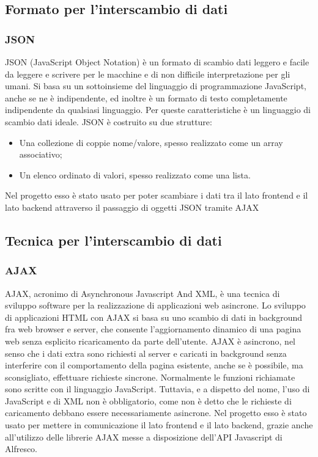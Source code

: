 \subsection{Formato per l’interscambio di dati}
\subsubsection{JSON}
JSON (JavaScript Object Notation) è un formato di scambio dati leggero e facile
da leggere e scrivere per le macchine e di non difficile interpretazione per gli umani. Si basa su un sottoinsieme del
linguaggio di programmazione JavaScript, anche se ne è indipendente, ed  inoltre è un formato di testo completamente indipendente da qualsiasi linguaggio.
Per queste caratteristiche è un linguaggio di scambio dati ideale. JSON è costruito su
due strutture:
\begin{itemize}
\item Una collezione di coppie nome/valore, spesso realizzato come un array associativo;
\item Un elenco ordinato di valori, spesso realizzato come una lista.
\end{itemize}
Nel progetto esso è stato usato per poter scambiare i dati tra il lato frontend e il lato backend attraverso il passaggio di oggetti JSON tramite AJAX
\subsection{Tecnica per l’interscambio di dati}
\subsubsection{AJAX}
AJAX, acronimo di Asynchronous Javascript And XML, è una tecnica di sviluppo
software per la realizzazione di applicazioni web asincrone.
Lo sviluppo di applicazioni HTML con AJAX si basa su uno scambio di dati in
background fra web browser e server, che consente l’aggiornamento dinamico di una
pagina web senza esplicito ricaricamento da parte dell’utente.
AJAX è asincrono, nel senso che i dati extra sono richiesti al server e caricati in
background senza interferire con il comportamento della pagina esistente, anche se è possibile, ma sconsigliato, effettuare richieste sincrone. Normalmente
le funzioni richiamate sono scritte con il linguaggio JavaScript. Tuttavia, e a dispetto
del nome, l’uso di JavaScript e di XML non è obbligatorio, come non è detto che le
richieste di caricamento debbano essere necessariamente asincrone.
Nel progetto esso è stato usato per mettere in comunicazione il lato frontend e il lato backend, grazie anche all'utilizzo delle librerie AJAX messe a disposizione dell'\gls{API} Javascript di Alfresco.

